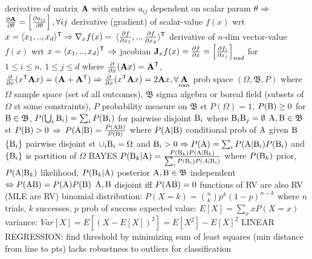 \documentclass[10pt]{article}
\begin{document}
\NEW    derivative of matrix ${\mathbf{A}}$ with entries $a_{ij}$ dependent on scalar param $\theta \Rightarrow$ $\frac{\partial {\mathbf{A}}}{\partial \theta} = \left[\frac{\partial a_{ij}}{\partial \theta}\right], \forall ij$
\NEW    derivative (gradient) of scalar-value $f(x)$ wrt $x = \langle x_1, .. , x_d\rangle^{\mathsf{T}} \Rightarrow \nabla_x f(x) = $ $\langle \frac{\partial f}{\partial x_1} ,..,\frac{\partial f}{\partial x_d} \rangle^{\mathsf{T}}$
\NEW    derivative of $n$-dim vector-value $f(x)$ wrt $x = \langle x_1, .. , x_d\rangle^{\mathsf{T}}$ $\Rightarrow$ jacobian ${\mathbf{J}}_x f(x) = \frac{\partial f}{\partial x} = \left[\frac{\partial f_i}{\partial x_j}\right]_{n\mathsf{x} d}$ for $\scriptstyle{1 \leq i \leq n,\,1 \leq j \leq d}$ where $\frac{\partial}{\partial x}({\mathbf{A}}x)={\mathbf{A}}^{\mathsf{T}}$, $\frac{\partial}{\partial x}(x^{\mathsf{T}} {\mathbf{A}}x) = ({\mathbf{A}} +{\mathbf{A}}^{\mathsf{T}}) \Rightarrow \frac{\partial}{\partial x}(x^{\mathsf{T}} {\mathbf{A}}x) = 2{\mathbf{A}}x, \forall\underset{n\mathsf{x} n}{{\mathbf{A}}}$ 
\NEW prob space $(\Omega, \mathfrak{B}, P)$ where $\Omega$ sample space (set of all outcomes), $\mathfrak{B}$ sigma algebra or boreal field (subsets of $\Omega$ st some constraints), $P$ probability measure on $\mathfrak{B}$ st $P(\Omega) = 1$, $P(\mathrm{B}) \geq 0$ for $\mathrm{B}\in\mathfrak{B}$, $P(\bigcup_i \mathrm{B}_i) = \sum_i P(\mathrm{B}_i)$ for pairwise disjoint $\mathrm{B}_i$ where $\mathrm{B}_i\mathrm{B}_j = \emptyset$
\NEW $\mathrm{A},\mathrm{B}\in\mathfrak{B}$ st $P(\mathrm{B}) > 0$ $\Rightarrow$ $P(\mathrm{A}|\mathrm{B}) = \frac{P(\mathrm{A}\mathrm{B})}{P(\mathrm{B})}$ where $P(\mathrm{A}|\mathrm{B})$ conditional prob of $\mathrm{A}$ given $\mathrm{B}$
\NEW $\{\mathrm{B}_i\}$ pairwise disjoint st $\cup_i\mathrm{B}_i = \Omega$ and $\mathrm{B}_i > 0 \Rightarrow P(\mathrm{A}) = \sum_i P(\mathrm{A}|\mathrm{B}_i)P(\mathrm{B}_i)$ and $\{\mathrm{B}_i\}$ is partition of $\Omega$
\NEW BAYES $P(\mathrm{B}_k|\mathrm{A}) = \frac{P(\mathrm{B}_k)P(\mathrm{A}|\mathrm{B}_k)}{\sum_i P(\mathrm{B}_i)P(A|\mathrm{B}_i)}$ where $P(\mathrm{B}_k)$ prior, $P(\mathrm{A}|\mathrm{B}_k)$ likelihood, $P(\mathrm{B}_k|\mathrm{A})$ posterior
\NEW $\mathrm{A},\mathrm{B}\in\mathfrak{B}$ independent $\Leftrightarrow P(\mathrm{A}\mathrm{B}) = P(\mathrm{A})P(\mathrm{B})$
\NEW $\mathrm{A},\mathrm{B}$ disjoint iff $P(\mathrm{A}\mathrm{B}) = 0$
\NEW functions of RV are also RV (MLE are RV)
\NEW binomial distribution: $P(X=k) = \binom{n}{k} p^k (1-p)^{n-k}$ where $n$ trials, $k$ successes, $p$ prob of success
\NEW expected value: $E[X] = \sum_x x P(X=x)$
\NEW variance: $Var[X] = E[(X-E[X])^2] = E[X^2] - E[X]^2$
\NEW LINEAR REGRESSION: find threshold by minimizing sum of least squares (min distance from line to pts)
\NEW lacks robustness to outliers for classification
\end{document}
